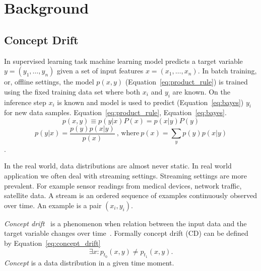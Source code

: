 \chapter{Background}
\section{Concept Drift}

In supervised learning task machine learning model predicts a target variable $y = (y_1, \dots, y_n)$ given a set of input features $x = (x_1, \dots, x_n)$.
In batch training, or, offline settings, the model $p(x, y)$ (Equation~\ref{eq:product_rule}) is trained using the fixed training data set where both $x_i$ and $y_i$ are known. 
On the inference step $x_i$ is known and model is used to predict (Equation~\ref{eq:bayes}) $y_i$ for new data samples. 
Equation~\ref{eq:product_rule}, Equation~\ref{eq:bayes}.
\begin{equation}\label{eq:product_rule}
  p(x,y) \equiv p(y|x)P(x) = p(x|y)P(y)
\end{equation}
\begin{equation}\label{eq:bayes}
  p(y | x) = \frac{p(y) p(x|y)}{p(x)}\: \text{, where}\: p(x)=\sum_{y} p(y) p(x|y)
\end{equation}.

In the real world, data distributions are almost never static. 
In real world application we often deal with streaming settings.
Streaming settings are more prevalent.
For example sensor readings from medical devices, network traffic, satellite data.
A stream is an ordered sequence of examples continuously observed over time. 
An example is a pair $(x_i, y_i)$.

\textit{Concept drift}~\cite{Widmer1996,schlimmer1986incremental,gama2014survey} is a phenomenon when relation between the input data and the target variable changes over time~\cite{gama2014survey}. 
Formally concept drift (CD) can be defined~\cite{gama2014survey} by Equation~\ref{eq:concept_drift}
\begin{equation}\label{eq:concept_drift}
    \exists x: p_{t_0}(x,y) \neq  p_{t_1}(x,y).
\end{equation}
\textit{Concept} is a data distribution in a given time moment.


